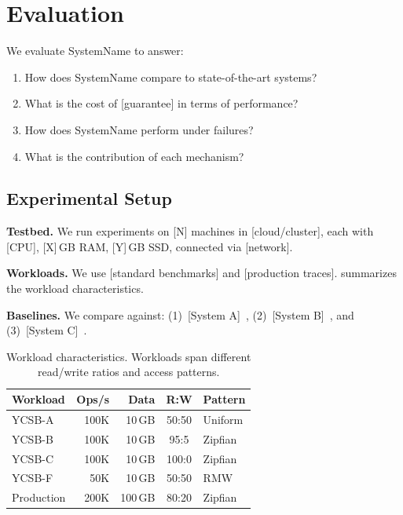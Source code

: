 \documentclass[sigplan,10pt]{acmart}
\newcommand{\system}{SystemName\xspace}
\newcommand{\para}[1]{\smallskip\noindent\textbf{#1.}}
\newcommand{\GB}{\,GB\xspace}
\begin{document}
\section{Evaluation}
\label{sec:evaluation}

We evaluate \system to answer:
\begin{enumerate}
  \item How does \system compare to state-of-the-art systems?
  \item What is the cost of [guarantee] in terms of performance?
  \item How does \system perform under failures?
  \item What is the contribution of each mechanism?
\end{enumerate}

\subsection{Experimental Setup}
\label{sec:eval:setup}

\para{Testbed}
We run experiments on [N] machines in [cloud/cluster], each with
[CPU], [X]\GB RAM, [Y]\GB SSD, connected via [network].

\para{Workloads}
We use [standard benchmarks] and [production traces].
 summarizes the workload characteristics.

\para{Baselines}
We compare against:
(1)~[System A]~\cite{ghemawat2003gfs},
(2)~[System B]~\cite{corbett2013spanner}, and
(3)~[System C]~\cite{decandia2007dynamo}.

\begin{table}[t]
  \caption{Workload characteristics. Workloads span different
    read/write ratios and access patterns.}
  \label{tab:workloads}
  \centering
  \begin{small}
  \begin{tabular}{@{}lrrcl@{}}
    \toprule
    \textbf{Workload} & \textbf{Ops/s} & \textbf{Data} &
    \textbf{R:W} & \textbf{Pattern} \\
    \midrule
    YCSB-A   & 100K  & 10\,GB  & 50:50  & Uniform   \\
    YCSB-B   & 100K  & 10\,GB  & 95:5   & Zipfian   \\
    YCSB-C   & 100K  & 10\,GB  & 100:0  & Zipfian   \\
    YCSB-F   & 50K   & 10\,GB  & 50:50  & RMW       \\
    Production& 200K  & 100\,GB & 80:20  & Zipfian   \\
    \bottomrule
  \end{tabular}
  \end{small}
\end{table}
\end{document}

